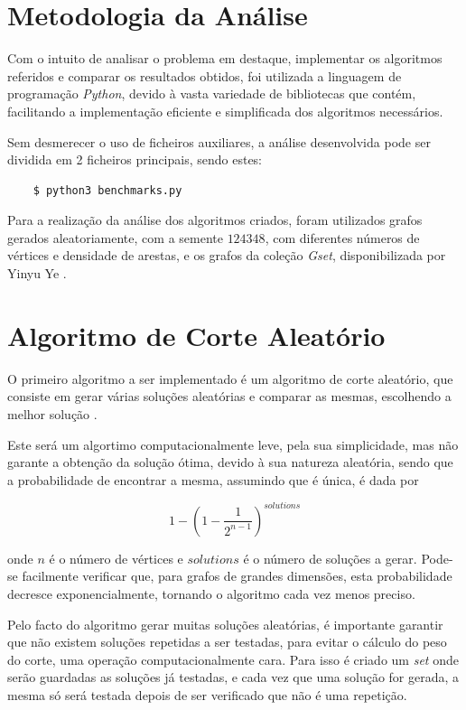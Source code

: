 \documentclass[mirror, portugues]{revdetua}
\begin{document}
\section{Metodologia da Análise}

Com o intuito de analisar o problema em destaque, implementar os algoritmos referidos e comparar os resultados obtidos, foi utilizada a linguagem de programação \textit{Python}, devido à vasta variedade de bibliotecas que contém, facilitando a implementação eficiente e simplificada dos algoritmos necessários.

Sem desmerecer o uso de ficheiros auxiliares, a análise desenvolvida pode ser dividida em 2 ficheiros principais, sendo estes:
\begin{verbatim}
    $ python3 benchmarks.py
\end{verbatim}

Para a realização da análise dos algoritmos criados, foram utilizados grafos gerados aleatoriamente, com a semente $124348$, com diferentes números de vértices e densidade de arestas, e os grafos da coleção \textit{Gset}, disponibilizada por Yinyu Ye \cite{GS24}.

\section{Algoritmo de Corte Aleatório}

O primeiro algoritmo a ser implementado é um algoritmo de corte aleatório, que consiste em gerar várias soluções aleatórias e comparar as mesmas, escolhendo a melhor solução \cite{AG14}.

Este será um algortimo computacionalmente leve, pela sua simplicidade, mas não garante a obtenção da solução ótima, devido à sua natureza aleatória, sendo que a probabilidade de encontrar a mesma, assumindo que é única, é dada por

$$1 - \left( 1 - \frac{1}{2^{n-1}} \right)^{solutions}$$

\noindent onde $n$ é o número de vértices e $solutions$ é o número de soluções a gerar. Pode-se facilmente verificar que, para grafos de grandes dimensões, esta probabilidade decresce exponencialmente, tornando o algoritmo cada vez menos preciso.

Pelo facto do algoritmo gerar muitas soluções aleatórias, é importante garantir que não existem soluções repetidas a ser testadas, para evitar o cálculo do peso do corte, uma operação computacionalmente cara. Para isso é criado um \textit{set} onde serão guardadas as soluções já testadas, e cada vez que uma solução for gerada, a mesma só será testada depois de ser verificado que não é uma repetição. 
\end{document}

